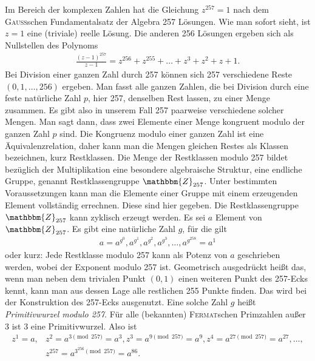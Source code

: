 \documentclass[11pt]{article}
\newcommand{\br}[1]{\ensuremath{\left(#1\right)}}
\newcommand{\Z}{\mathbbm{Z}}
\begin{document}
Im Bereich der komplexen Zahlen hat die Gleichung $z^{257} = 1$ nach dem
\textsc{Gauss}schen Fundamentalsatz der Algebra 257 Lösungen. Wie man sofort
sieht, ist $z = 1$ eine (triviale) reelle Lösung. Die anderen 256 Lösungen
ergeben sich als Nullstellen des Polynoms
\begin{gather*}
   \frac{\br{z-1}^{257}}{z-1}=z^{256}+z^{255}+\ldots+z^3+z^2+z+1.
\end{gather*}
Bei Division einer ganzen Zahl durch 257 können sich 257 verschiedene Reste
$(0, 1, \ldots, 256)$ ergeben. Man fasst alle ganzen Zahlen, die bei Division
durch eine feste natürliche Zahl $p$, hier 257, denselben Rest lassen, zu
einer Menge zusammen. Es gibt also in unserem Fall 257 paarweise verschiedene
solcher Mengen. Man sagt dann, dass zwei Elemente einer Menge kongruent modulo
der ganzen Zahl $p$ sind. Die Kongruenz modulo einer ganzen Zahl ist eine
Äquivalenzrelation, daher kann man die Mengen gleichen Restes als Klassen
bezeichnen, kurz Restklassen. Die Menge der Restklassen modulo 257 bildet
bezüglich der Multiplikation eine besondere algebraische Struktur, eine
endliche Gruppe, genannt Restklassengruppe $\Z_{257}$. Unter bestimmten
Voraussetzungen kann man die Elemente einer Gruppe mit einem erzeugenden
Element vollständig errechnen. Diese sind hier gegeben. Die Restklassengruppe
$\Z_{257}$ kann zyklisch erzeugt werden. Es sei $a$ Element von $\Z_{257}$. Es
gibt eine natürliche Zahl $g$, für die gilt
\begin{gather*}
  a = a^{g^0}, a^{g^1}, a^{g^2}, a^{g^3}, \ldots, a^{g^{258}} = a^1 
\end{gather*}
oder kurz: Jede Restklasse modulo 257 kann als Potenz von $a$ geschrieben
werden, wobei der Exponent modulo 257 ist. Geometrisch ausgedrückt heißt das,
wenn man neben dem trivialen Punkt $(0,1)$ einen weiteren Punkt des 257-Ecks
kennt, kann man aus dessen Lage alle restlichen 255 Punkte finden. Das wird
bei der Konstruktion des 257-Ecks ausgenutzt. Eine solche Zahl $g$ heißt
\emph{Primitivwurzel modulo 257}. Für alle (bekannten) \textsc{Fermat}schen
Primzahlen außer 3 ist 3 eine Primitivwurzel. Also ist
\begin{align*}
  z^1 = a,& z^2 = a^{3 \pmod{257}}= a^3, z^3 = a^{9 \pmod{257}} =a^9, z^4 =
  a^{27 \pmod{257}} = a^{27}, \ldots,\\& z^{257} = a^{3^{256} \pmod{257}} =
  a^{86}.
\end{align*}
\end{document}
